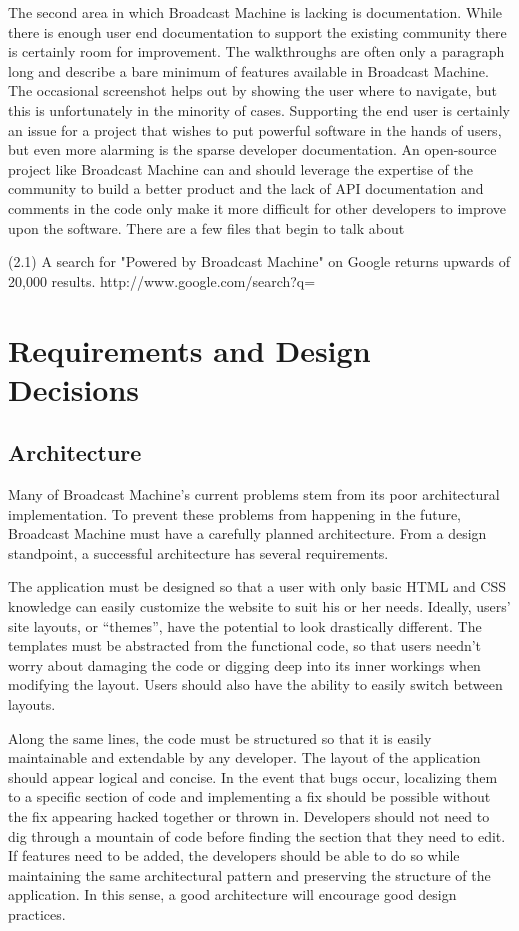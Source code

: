 \documentclass[a4paper,12pt]{report}
\begin{document}
	The second area in which Broadcast Machine is lacking is documentation. While there is enough user end documentation to support the existing community there is certainly room for improvement. The walkthroughs are often only a paragraph long and describe a bare minimum of features available in Broadcast Machine. The occasional screenshot helps out by showing the user where to navigate, but this is unfortunately in the minority of cases. Supporting the end user is certainly an issue for a project that wishes to put powerful software in the hands of users, but even more alarming is the sparse developer documentation. An open-source project like Broadcast Machine can and should leverage the expertise of the community to build a better product and the lack of API documentation and comments in the code only make it more difficult for other developers to improve upon the software. There are a few files that begin to talk about 
	
(2.1) A search for "Powered by Broadcast Machine" on Google returns upwards of 20,000 results.
http://www.google.com/search?q=%

\chapter{Requirements and Design Decisions}

\section{Architecture}

	Many of Broadcast Machine’s current problems stem from its poor architectural implementation. To prevent these problems from happening in the future, Broadcast Machine must have a carefully planned architecture. From a design standpoint, a successful architecture has several requirements.

The application must be designed so that a user with only basic HTML and CSS knowledge can easily customize the website to suit his or her needs. Ideally, users’ site layouts, or “themes”, have the potential to look drastically different. The templates must be abstracted from the functional code, so that users needn’t worry about damaging the code or digging deep into its inner workings when modifying the layout. Users should also have the ability to easily switch between layouts.

Along the same lines, the code must be structured so that it is easily maintainable and extendable by any developer. The layout of the application should appear logical and concise. In the event that bugs occur, localizing them to a specific section of code and implementing a fix should be possible without the fix appearing hacked together or thrown in. Developers should not need to dig through a mountain of code before finding the section that they need to edit. If features need to be added, the developers should be able to do so while maintaining the same architectural pattern and preserving the structure of the application. In this sense, a good architecture will encourage good design practices.
\end{document}
